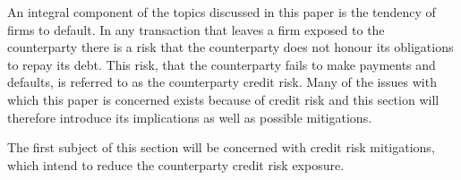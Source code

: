 \documentclass[main.tex]{subfiles}
\begin{document}
    An integral component of the topics discussed in this paper is the tendency of firms to default.
    In any transaction that leaves a firm exposed to the counterparty
    there is a risk that the counterparty does not honour its obligations to repay its debt.
    This risk, that the counterparty fails to make payments and defaults, 
    is referred to as the counterparty credit risk.
    Many of the issues with which this paper is concerned exists because of credit risk 
    and this section will therefore introduce its implications as well as possible mitigations.

    The first subject of this section will be concerned with credit risk mitigations,
    which intend to reduce the counterparty credit risk exposure.
\end{document}
